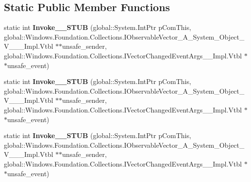 \subsection*{Static Public Member Functions}
\begin{DoxyCompactItemize}
\item 
\mbox{\label{struct_windows_1_1_foundation_1_1_collections_1_1_vector_changed_event_handler___a___system___object___v_______impl_1_1_vtbl_aad92b0e62192f767e2a0a193efec22f4}} 
static int {\bfseries Invoke\+\_\+\+\_\+\+S\+T\+UB} (global\+::\+System.\+Int\+Ptr p\+Com\+This, global\+::\+Windows.\+Foundation.\+Collections.\+I\+Observable\+Vector\+\_\+\+A\+\_\+\+System\+\_\+\+Object\+\_\+\+V\+\_\+\+\_\+\+\_\+\+Impl.\+Vtbl $\ast$$\ast$unsafe\+\_\+sender, global\+::\+Windows.\+Foundation.\+Collections.\+I\+Vector\+Changed\+Event\+Args\+\_\+\+\_\+\+Impl.\+Vtbl $\ast$$\ast$unsafe\+\_\+event)
\item 
\mbox{\label{struct_windows_1_1_foundation_1_1_collections_1_1_vector_changed_event_handler___a___system___object___v_______impl_1_1_vtbl_aad92b0e62192f767e2a0a193efec22f4}} 
static int {\bfseries Invoke\+\_\+\+\_\+\+S\+T\+UB} (global\+::\+System.\+Int\+Ptr p\+Com\+This, global\+::\+Windows.\+Foundation.\+Collections.\+I\+Observable\+Vector\+\_\+\+A\+\_\+\+System\+\_\+\+Object\+\_\+\+V\+\_\+\+\_\+\+\_\+\+Impl.\+Vtbl $\ast$$\ast$unsafe\+\_\+sender, global\+::\+Windows.\+Foundation.\+Collections.\+I\+Vector\+Changed\+Event\+Args\+\_\+\+\_\+\+Impl.\+Vtbl $\ast$$\ast$unsafe\+\_\+event)
\item 
\mbox{\label{struct_windows_1_1_foundation_1_1_collections_1_1_vector_changed_event_handler___a___system___object___v_______impl_1_1_vtbl_aad92b0e62192f767e2a0a193efec22f4}} 
static int {\bfseries Invoke\+\_\+\+\_\+\+S\+T\+UB} (global\+::\+System.\+Int\+Ptr p\+Com\+This, global\+::\+Windows.\+Foundation.\+Collections.\+I\+Observable\+Vector\+\_\+\+A\+\_\+\+System\+\_\+\+Object\+\_\+\+V\+\_\+\+\_\+\+\_\+\+Impl.\+Vtbl $\ast$$\ast$unsafe\+\_\+sender, global\+::\+Windows.\+Foundation.\+Collections.\+I\+Vector\+Changed\+Event\+Args\+\_\+\+\_\+\+Impl.\+Vtbl $\ast$$\ast$unsafe\+\_\+event)

\end{DoxyCompactItemize}
